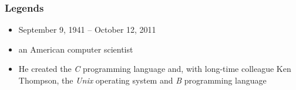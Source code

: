 \documentclass{../c-lecture}
\begin{document}
\begin{frame}
  \frametitle{Legends}
  \begin{itemize}
    \item September 9, 1941 – October 12, 2011
    \item an American computer scientist
    \item He created the \textit{\color{Orange} C} programming language and,
      with long-time colleague Ken Thompson, the \textit{\color{LimeGreen} Unix} operating system and \textit{\color{RubineRed} B} programming language
  \end{itemize}
\end{frame}
\end{document}
